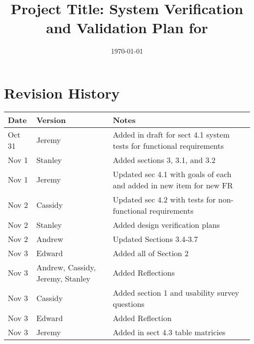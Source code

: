 \documentclass[12pt, titlepage]{article}
\begin{document}
\title{Project Title: System Verification and Validation Plan for \progname{}} 
\author{\authname}
\date{\today}
	
\maketitle


\section*{Revision History}

\begin{tabularx}{\textwidth}{p{3cm}p{2cm}X}
\toprule {\bf Date} & {\bf Version} & {\bf Notes}\\
\midrule
Oct 31 & Jeremy & Added in draft for sect 4.1 system tests for functional requirements \\ 
Nov 1 & Stanley & Added sections 3, 3.1, and 3.2 \\
Nov 1 & Jeremy & Updated sec 4.1 with goals of each and added in new item for new FR \\
Nov 2 & Cassidy & Updated sec 4.2 with tests for non-functional requirements \\
Nov 2 & Stanley & Added design verification plans \\
Nov 2 & Andrew & Updated Sections 3.4-3.7\\
Nov 3 & Edward & Added all of Section 2\\
Nov 3 & Andrew, Cassidy, Jeremy, Stanley & Added Reflections\\
Nov 3 & Cassidy & Added section 1 and usability survey questions \\
Nov 3 & Edward & Added Reflection\\
Nov 3 & Jeremy & Added in sect 4.3 table matricies\\
\bottomrule
\end{tabularx}

%
\end{document}
